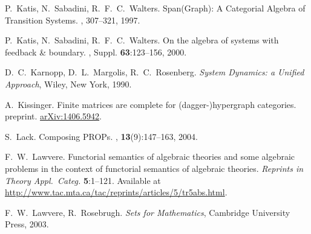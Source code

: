 \begin{thebibliography}{RSW00}
    P.\ Katis, N.\ Sabadini, R.\ F.\ C.\ Walters.
    \newblock Span(Graph): A Categorial Algebra of Transition Systems.
    , 307--321, 1997. 

    P.\ Katis, N.\ Sabadini, R.\ F.\ C.\ Walters.
    \newblock On the algebra of systems with feedback \& boundary.
    ,
    Suppl. {\bf 63}:123--156, 2000.



    D.\ C.\ Karnopp, D.\ L.\ Margolis, R.\ C.\ Rosenberg.
    \newblock \textsl{System Dynamics: a Unified Approach}, Wiley, New York, 1990.

    A.\ Kissinger.
    \newblock Finite matrices are complete for (dagger-)hypergraph categories.
    \newblock preprint.
    \newblock \href{http://arxiv.org/abs/1406.5942}{arXiv:1406.5942}.

    S.\ Lack.
    \newblock Composing PROPs.
    , {\bf 13}(9):147--163,
    2004.

    F.\ W.\ Lawvere.
    \newblock Functorial semantics of algebraic theories and
    some algebraic problems in the context of functorial semantics of algebraic
    theories.
    \newblock \textsl{Reprints in Theory Appl.\ Categ.} {\bf 5}:1--121.
    \newblock 
    Available at
    \href{http://www.tac.mta.ca/tac/reprints/articles/5/tr5abs.html}
    {http://www.tac.mta.ca/tac/reprints/articles/5/tr5abs.html}.

    F.\ W.\ Lawvere, R.\ Rosebrugh.
    \newblock \emph{Sets for Mathematics},
    Cambridge University Press, 2003.


\end{thebibliography}

